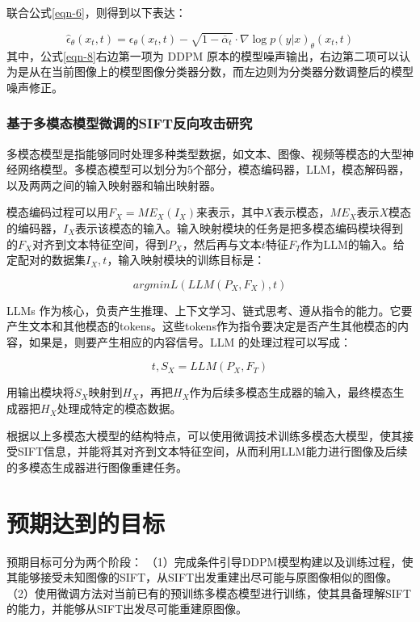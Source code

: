 联合公式\eqref{eqn-6}，则得到以下表达：

\begin{equation}\label{eqn-8}
      \hat{\epsilon}_\theta(x_t,t) = \epsilon_\theta(x_t,t) -\sqrt{1-\overline{\alpha}_t} \cdot \nabla \log p(y|x)_\theta(x_t,t)
\end{equation}
其中，公式\eqref{eqn-8}右边第一项为 DDPM 原本的模型噪声输出，右边第二项可以认为是从在当前图像上的模型图像分类器分数，而左边则为分类器分数调整后的模型噪声修正。

\subsubsection{基于多模态模型微调的SIFT反向攻击研究}
多模态模型是指能够同时处理多种类型数据，如文本、图像、视频等模态的大型神经网络模型。多模态模型可以划分为5个部分，模态编码器，LLM，模态解码器，以及两两之间的输入映射器和输出映射器。
\par
模态编码过程可以用$F_X = ME_X(I_X)$来表示，其中$X$表示模态，$ME_X$表示$X$模态的编码器，$I_X$表示该模态的输入。输入映射模块的任务是把多模态编码模块得到的$F_X$对齐到文本特征空间，得到$P_X$，然后再与文本$t$特征$F_T$作为LLM的输入。给定配对的数据集${I_X,t}$，输入映射模块的训练目标是：

\begin{equation}\label{eqn-9}
      argmin L(LLM(P_X,F_X),t)
\end{equation}

LLMs 作为核心，负责产生推理、上下文学习、链式思考、遵从指令的能力。它要产生文本和其他模态的tokens。这些tokens作为指令要决定是否产生其他模态的内容，如果是，则要产生相应的内容信号。LLM 的处理过程可以写成：

\begin{equation}\label{eqn-10}
      t,S_X = LLM(P_X,F_T)
\end{equation}

用输出模块将$S_X$映射到$H_X$，再把$H_X$作为后续多模态生成器的输入，最终模态生成器把$H_X$处理成特定的模态数据。
\par
根据以上多模态大模型的结构特点，可以使用微调技术训练多模态大模型，使其接受SIFT信息，并能将其对齐到文本特征空间，从而利用LLM能力进行图像及后续的多模态生成器进行图像重建任务。
\section{预期达到的目标}
预期目标可分为两个阶段：
（1）完成条件引导DDPM模型构建以及训练过程，使其能够接受未知图像的SIFT，从SIFT出发重建出尽可能与原图像相似的图像。
（2）使用微调方法对当前已有的预训练多模态模型进行训练，使其具备理解SIFT的能力，并能够从SIFT出发尽可能重建原图像。


